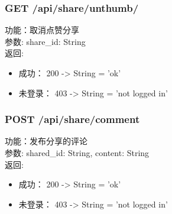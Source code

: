 	\subsubsection{GET /api/share/unthumb/}
	\noindent
	功能：取消点赞分享\\
	参数: share\_id: String\\
	返回:
	\begin{itemize}
		\item 成功： 200 -> String = 'ok'
		\item 未登录： 403 -> String = 'not logged in'
	\end{itemize}



	\subsubsection{POST /api/share/comment}
	\noindent
	功能：发布分享的评论\\
	参数: shared\_id: String, content: String\\
	返回:
	\begin{itemize}
		\item 成功： 200 -> String = 'ok'
		\item 未登录： 403 -> String = 'not logged in'
	\end{itemize}


